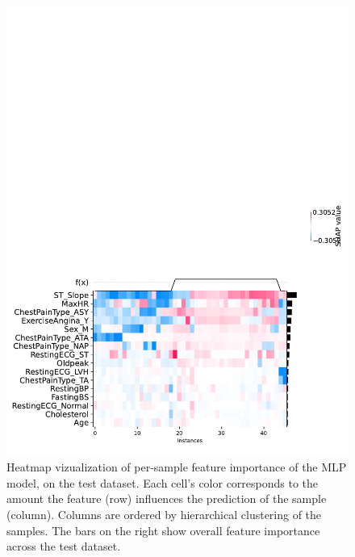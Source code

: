 \begin{figure}
    \centering
    \includegraphics[trim=0 0 2.8cm 16cm,clip,width=1\columnwidth]{images/shap_heatmap.pdf}
    \caption{Heatmap vizualization of per-sample feature importance of the MLP model, on the test dataset. Each cell's color corresponds to the amount the feature (row) influences the prediction of the sample (column). Columns are ordered by hierarchical clustering of the samples. The bars on the right show overall feature importance across the test dataset.}
    \label{fig:shap_heatmap}
\end{figure}

